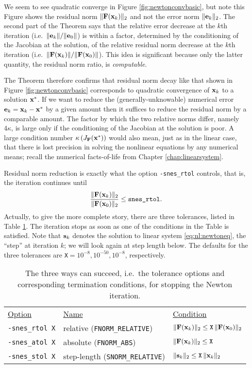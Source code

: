 We seem to see quadratic converge in Figure \ref{fig:newtonconvbasic}, but note this Figure shows the residual norm $\|\mathbf{F}(\mathbf{x}_k)\|_2$ and not the error norm $\|\mathbf{e}_k\|_2$.  The second part of the Theorem says that the relative error decrease at the $k$th iteration (i.e.~$\|\mathbf{e}_k\|/\|\mathbf{e}_0\|$) is within a factor, determined by the conditioning of the Jacobian at the solution, of the relative residual norm decrease at the $k$th iteration (i.e.~$\|\mathbf{F}(\mathbf{x}_k)\|/\|\mathbf{F}(\mathbf{x}_0)\|$).  This idea is significant because only the latter quantity, the residual norm ratio, is \emph{computable}.

The Theorem therefore confirms that residual norm decay like that shown in Figure \ref{fig:newtonconvbasic} corresponds to quadratic convergence of $\mathbf{x}_k$ to a solution $\mathbf{x}^*$.  If we want to reduce the (generally-unknowable) numerical error $\mathbf{e}_k=\mathbf{x}_k-\mathbf{x}^*$ by a given amount then it suffices to reduce the residual norm by a comparable amount.  The factor by which the two relative norms differ, namely $4 \kappa$, is large only if the conditioning of the Jacobian at the solution is poor.  A large condition number $\kappa\left(J_{\mathbf{F}}(\mathbf{x}^*)\right)$ would also mean, just as in the linear case, that there is lost precision in solving the nonlinear equations by any numerical means; recall the numerical facts-of-life from Chapter \ref{chap:linearsystem}.

Residual norm reduction is exactly what the option \texttt{-snes\_rtol} controls, that is, the iteration continues until
    $$\frac{\|\mathbf{F}(\mathbf{x}_k)\|_2}{\|\mathbf{F}(\mathbf{x}_0)\|_2} \le \text{\texttt{snes\_rtol}}.$$
Actually, to give the more complete story, there are three \pSNES tolerances, listed in Table \ref{tab:snestolerances}.  The iteration stops as soon as one of the conditions in the Table is satisfied.  Note that $\mathbf{s}_k$ denotes the solution to linear system \eqref{eq:nl:newtoneq}, the ``step'' at iteration $k$; we will look again at step length below.  The defaults for the three tolerances are \texttt{X}$=10^{-8},10^{-50},10^{-8}$, respectively.

\begin{table}
\begin{tabular}{lll}
\underline{Option}\hspace{0.2in} & \underline{Name}\hspace{0.2in} & \underline{Condition}\hspace{0.2in} \\
\texttt{-snes\_rtol X} & relative (\texttt{FNORM\_RELATIVE}) & $\|\mathbf{F}(\mathbf{x}_k)\|_2 \le \text{\texttt{X}}\, \|\mathbf{F}(\mathbf{x}_0)\|_2$ \\
\texttt{-snes\_atol X} & absolute (\texttt{FNORM\_ABS}) & $\|\mathbf{F}(\mathbf{x}_k)\|_2 \le \text{\texttt{X}}$ \\
\texttt{-snes\_stol X} & step-length (\texttt{SNORM\_RELATIVE}) & $\|\mathbf{s}_k\|_2 \le \text{\texttt{X}}\, \|\mathbf{x}_k\|_2$
\end{tabular}
\caption{The three ways \pSNES can succeed, i.e.~the tolerance options and corresponding termination conditions, for stopping the Newton iteration.} \label{tab:snestolerances}
\end{table}

